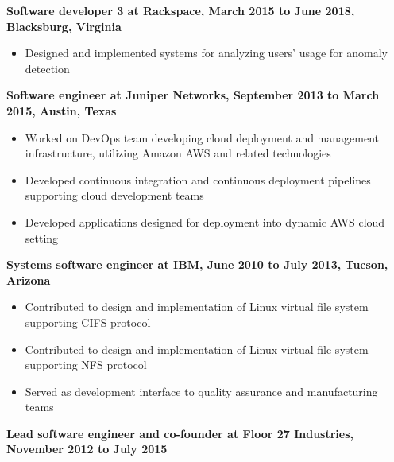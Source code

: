 \documentclass[10pt]{res}
\begin{document}
\begin{resume}
\begin{flushleft}
{\bf Software developer 3 at Rackspace, March 2015 to June 2018, Blacksburg, Virginia}
\end{flushleft}

\begin{itemize}
\setlength{\itemsep}{1pt}
\setlength{\parskip}{0pt}
\setlength{\parsep}{0pt}
\item Designed and implemented systems for analyzing users' usage for anomaly detection
\end{itemize}

\begin{flushleft}
{\bf Software engineer at Juniper Networks, September 2013 to March 2015, Austin, Texas}
\end{flushleft}

\begin{itemize}
\setlength{\itemsep}{1pt}
\setlength{\parskip}{0pt}
\setlength{\parsep}{0pt}
\item Worked on DevOps team developing cloud deployment and management infrastructure, utilizing Amazon AWS and related technologies
\item Developed continuous integration and continuous deployment pipelines supporting cloud development teams
\item Developed applications designed for deployment into dynamic AWS cloud setting
\end{itemize}

\begin{flushleft}
{\bf Systems software engineer at IBM, June 2010 to July 2013, Tucson, Arizona}
\end{flushleft}

\begin{itemize}
\setlength{\itemsep}{1pt}
\setlength{\parskip}{0pt}
\setlength{\parsep}{0pt}
\item Contributed to design and implementation of Linux virtual file system supporting CIFS protocol
\item Contributed to design and implementation of Linux virtual file system supporting NFS protocol
\item Served as development interface to quality assurance and manufacturing teams
\end{itemize}

\begin{flushleft}
{\bf Lead software engineer and co-founder at Floor 27 Industries, November 2012 to July 2015}
\end{flushleft}


\end{resume}
\end{document}
